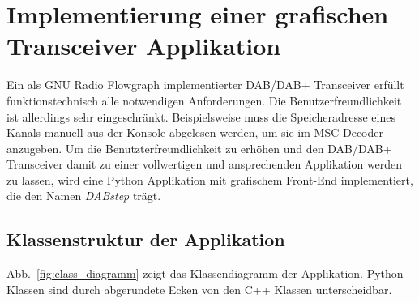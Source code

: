 \chapter{Implementierung einer grafischen Transceiver Applikation}
Ein als GNU Radio Flowgraph implementierter DAB/DAB+ Transceiver erfüllt funktionstechnisch alle notwendigen Anforderungen. Die Benutzerfreundlichkeit ist allerdings sehr eingeschränkt. Beispielsweise muss die Speicheradresse eines Kanals manuell aus der Konsole abgelesen werden, um sie im MSC Decoder anzugeben. Um die Benutzterfreundlichkeit zu erhöhen und den DAB/DAB+ Transceiver damit zu einer vollwertigen und ansprechenden Applikation werden zu lassen, wird eine Python Applikation mit grafischem Front-End implementiert, die den Namen \textit{DABstep} trägt.
\section{Klassenstruktur der Applikation}
Abb.~\ref{fig:class_diagramm} zeigt das Klassendiagramm der Applikation. Python Klassen sind durch abgerundete Ecken von den C++ Klassen unterscheidbar.

